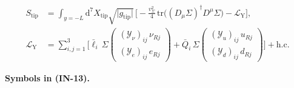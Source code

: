 \documentclass[
  10pt,
]{article}
\begin{document}
\[
\begin{aligned}
S_{\mathrm{tip}} &= \int_{y=-L}\mathrm{d}^7X_{\mathrm{tip}}\sqrt{\lvert g_{\mathrm{tip}}\rvert}\,\Big[
 -\frac{v_\Sigma^2}{4}\,\mathrm{tr}\big((D_\mu\Sigma)^\dagger D^\mu\Sigma\big) -
 \mathcal{L}_{\mathrm{Y}}\Big],\\
\mathcal{L}_{\mathrm{Y}} &=
 \sum_{i,j=1}^{3}\Big[\bar\ell_i\,\Sigma\begin{pmatrix}(\mathcal{Y}_\nu)_{ij}\,\nu_{Rj}\\
 (\mathcal{Y}_e)_{ij}\,e_{Rj}\end{pmatrix}
 + \bar Q_i\,\Sigma\begin{pmatrix}(\mathcal{Y}_u)_{ij}\,u_{Rj}\\ (\mathcal{Y}_d)_{ij}\,d_{Rj}
 \end{pmatrix}\Big]
 + \text{h.c.}
\end{aligned} \tag{IN-13}
\]

\textbf{Symbols in (IN-13).}
\end{document}

